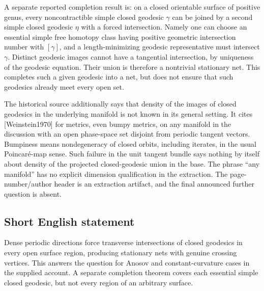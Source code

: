 \documentclass[11pt]{article}
\begin{document}
A separate reported completion result is: on a closed orientable surface of positive genus, every noncontractible simple closed geodesic \(\gamma\) can be joined by a second simple closed geodesic \(\eta\) with a forced intersection. Namely one can choose an essential simple free homotopy class having positive geometric intersection number with \([\gamma]\), and a length-minimizing geodesic representative must intersect \(\gamma\). Distinct geodesic images cannot have a tangential intersection, by uniqueness of the geodesic equation. Their union is therefore a nontrivial stationary net. This completes such a given geodesic into a net, but does not ensure that such geodesics already meet every open set.

The historical source additionally says that density of the images of closed geodesics in the underlying manifold is not known in its general setting. It cites [Weinstein1970] for metrics, even bumpy metrics, on any manifold in the discussion with an open phase-space set disjoint from periodic tangent vectors. Bumpiness means nondegeneracy of closed orbits, including iterates, in the usual Poincaré-map sense. Such failure in the unit tangent bundle says nothing by itself about density of the projected closed-geodesic union in the base. The phrase ``any manifold'' has no explicit dimension qualification in the extraction. The page-number/author header is an extraction artifact, and the final announced further question is absent.
\subsection{Short English statement}
Dense periodic directions force transverse intersections of closed geodesics in every open surface region, producing stationary nets with genuine crossing vertices. This answers the question for Anosov and constant-curvature cases in the supplied account. A separate completion theorem covers each essential simple closed geodesic, but not every region of an arbitrary surface.
\end{document}
